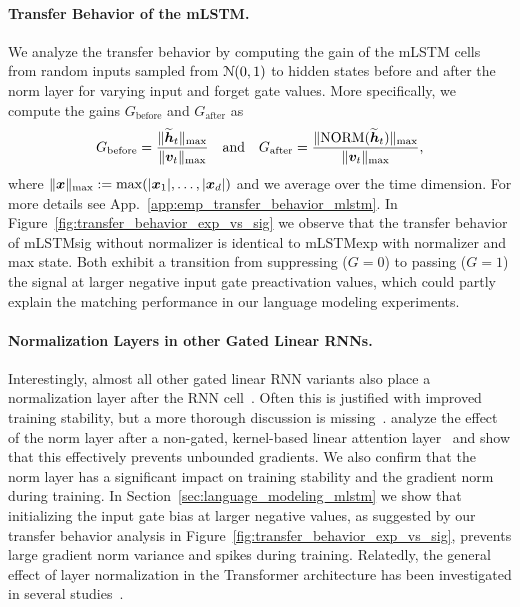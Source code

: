 \documentclass{article}
\begin{document}
\paragraph{Transfer Behavior of the mLSTM.}
We analyze the transfer behavior by computing the gain of the mLSTM cells from random inputs sampled from $\mathcal{N}(0, 1)$ to hidden states before and after the norm layer for varying input and forget gate values.
More specifically, we compute the gains $G_\mathrm{before}$ and $G_\mathrm{after}$ as
\begin{equation}
    \label{eq:gain}
    G_\mathrm{before} = \frac{\lVert\widetilde{\bm{h}}_t\rVert_{\mathrm{max}}}{\lVert\bm{v}_t\rVert_{\mathrm{max}}} \quad
    \text{and} \quad
    G_\mathrm{after} = \frac{\lVert\mathrm{NORM} (\widetilde{\bm{h}}_t) \rVert_{\mathrm{max}}}{\lVert\bm{v}_t\rVert_{\mathrm{max}}},
\end{equation}
where $\lVert\bm{x}\rVert_{\mathrm{max}} := \max(|\bm{x}_1|, \dots, |\bm{x}_d|)$ and we average over the time dimension.
For more details see App.~\ref{app:emp_transfer_behavior_mlstm}.
In Figure~\ref{fig:transfer_behavior_exp_vs_sig} we observe that the transfer behavior of mLSTMsig without normalizer is identical to mLSTMexp with normalizer and max state. Both exhibit a transition from suppressing ($G=0$) to passing ($G=1$) the signal at larger negative input gate preactivation values, which could partly explain the matching performance in our language modeling experiments.
\vspace{-0.1cm}
\paragraph{Normalization Layers in other Gated Linear RNNs.}
Interestingly, almost all other gated linear RNN variants also place a normalization layer after the RNN cell~\citep{sun:23retentive, dao:24transformersaressms, qin:24hgrn2, yang:24gated}.
Often this is justified with improved training stability, but a more thorough discussion is missing~\citep{lieber:24jamba}.
\citet{qin:22devil} analyze the effect of the norm layer after a non-gated, kernel-based linear attention layer~\citep{katharopoulos:20linearattention} and show that this effectively prevents unbounded gradients.
We also confirm that the norm layer has a significant impact on training stability and the gradient norm during training.
In Section~\ref{sec:language_modeling_mlstm} we show that initializing the input gate bias at larger negative values, as suggested by our transfer behavior analysis in Figure~\ref{fig:transfer_behavior_exp_vs_sig}, prevents large gradient norm variance and spikes during training.
Relatedly, the general effect of layer normalization in the Transformer architecture has been investigated in several studies~\citep{xiong:20onlayernormtransformer, zhu:25transformerswithout}.
\vspace{-0.2cm}
\end{document}
